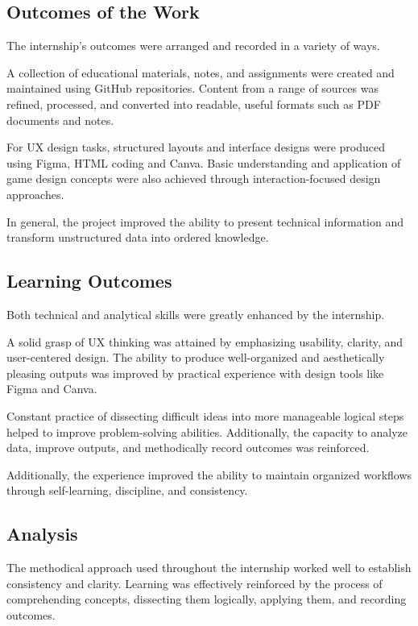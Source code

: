 \documentclass[12pt]{article}
\begin{document}
\subsection{Outcomes of the Work}

The internship's outcomes were arranged and recorded in a variety of ways.

A collection of educational materials, notes, and assignments were created and maintained using GitHub repositories. Content from a range of sources was refined, processed, and converted into readable, useful formats such as PDF documents and notes.

For UX design tasks, structured layouts and interface designs were produced using Figma, HTML coding and Canva. Basic understanding and application of game design concepts were also achieved through interaction-focused design approaches.

In general, the project improved the ability to present technical information and transform unstructured data into ordered knowledge.

\subsection{Learning Outcomes}

Both technical and analytical skills were greatly enhanced by the internship.

A solid grasp of UX thinking was attained by emphasizing usability, clarity, and user-centered design. The ability to produce well-organized and aesthetically pleasing outputs was improved by practical experience with design tools like Figma and Canva.

Constant practice of dissecting difficult ideas into more manageable logical steps helped to improve problem-solving abilities. Additionally, the capacity to analyze data, improve outputs, and methodically record outcomes was reinforced.

Additionally, the experience improved the ability to maintain organized workflows through self-learning, discipline, and consistency.

\subsection{Analysis}

The methodical approach used throughout the internship worked well to establish consistency and clarity. Learning was effectively reinforced by the process of comprehending concepts, dissecting them logically, applying them, and recording outcomes.
\end{document}
